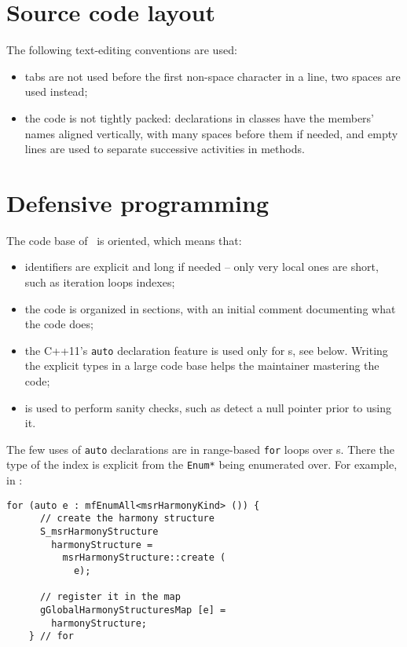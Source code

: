 \section{Source code layout}

The following text-editing conventions are used:
\begin{itemize}
\item tabs are not used before the first non-space character in a line, two spaces are used instead;

\item the code is not tightly packed: declarations in classes have the members' names aligned vertically, with many spaces before them if needed, and empty lines are used to separate successive activities in methods.
\end{itemize}


\section{Defensive programming}

The code base of \xmlToLy\ is  oriented, which means that:
\begin{itemize}
\item identifiers are explicit and long if needed -- only very local ones are short, such as iteration loops indexes;

\item the code is organized in sections, with an initial comment documenting what the code does;

\item the C++11's {\tt auto} declaration feature is used only for \enumType s, see below. Writing the explicit types in a large code base helps the maintainer mastering the code;

\item {} is used to perform sanity checks, such as detect a null pointer prior to using it.
\end{itemize}

The few uses of {\tt auto} declarations are in range-based {\tt for} loops over \enumType s. There the type of the index is explicit from the {\tt Enum*} being enumerated over. For example, in :
\begin{lstlisting}[language=CPlusPlus]
    for (auto e : mfEnumAll<msrHarmonyKind> ()) {
      // create the harmony structure
      S_msrHarmonyStructure
        harmonyStructure =
          msrHarmonyStructure::create (
            e);

      // register it in the map
      gGlobalHarmonyStructuresMap [e] =
        harmonyStructure;
    } // for
\end{lstlisting}

